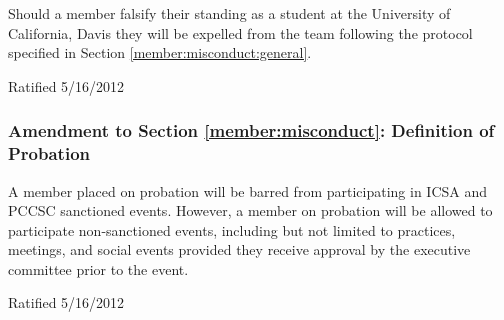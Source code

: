 \documentclass[12pt,titlepage,letter]{article}
\begin{document}
Should a member falsify their standing as a student at the University of California, Davis they will be expelled from the team following the protocol specified in Section \ref{member:misconduct:general}.

Ratified 5/16/2012

\subsubsection{Amendment to Section \ref{member:misconduct}: Definition of Probation}

A member placed on probation will be barred from participating in ICSA and PCCSC sanctioned events. However, a member on probation will be allowed to participate non-sanctioned events, including but not limited to practices, meetings, and social events provided they receive approval by the executive committee prior to the event.

Ratified 5/16/2012
\end{document}
